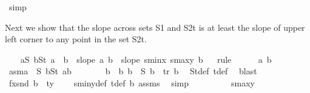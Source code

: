 \begin{isabellebody}
\ simp\isanewline
\ \ \isamarkupfalse%
%
\begin{isamarkuptext}%
Next we show that the slope across sets S1 and S2t is at least the slope of upper left corner to any point in the set S2t.%
\end{isamarkuptext}\isamarkuptrue%
\ \ \isamarkupfalse%
\ {\isachardoublequoteopen}{\isasymforall}a{\isasymin}S{}{\isachardot}{\kern0pt}\ {\isasymforall}b{\isasymin}S{}t{\isachardot}{\kern0pt}\ a\ {\isacharless}{\kern0pt}\ b\ {\isasymlongrightarrow}\ slope\ a\ b\ {\isasymge}\ slope\ {\isacharparenleft}{\kern0pt}s{}{\isacharunderscore}{\kern0pt}minx{\isacharcomma}{\kern0pt}\ s{}{\isacharunderscore}{\kern0pt}maxy{\isacharparenright}{\kern0pt}\ b{\isachardoublequoteclose}\isanewline
\ \ \isamarkupfalse%
{\isacharparenleft}{\kern0pt}rule{\isacharplus}{\kern0pt}{\isacharparenright}{\kern0pt}\isanewline
\ \ \ \ \isamarkupfalse%
\ a\ b\ \isamarkupfalse%
\ asm{\isacharcolon}{\kern0pt}{\isachardoublequoteopen}a\ {\isasymin}\ S{}{\isachardoublequoteclose}\ {\isachardoublequoteopen}b{\isasymin}S{}t{\isachardoublequoteclose}\ {\isachardoublequoteopen}a{\isacharless}{\kern0pt}b{\isachardoublequoteclose}\isanewline
\ \ \ \ \isamarkupfalse%
\ \isamarkupfalse%
\ b{}\ \ b{}{\isacharcolon}{\kern0pt}\ {\isachardoublequoteopen}b{}\ {\isasymin}\ S{}{\isachardoublequoteclose}\ {\isachardoublequoteopen}b\ {\isacharequal}{\kern0pt}\ {\isacharquery}{\kern0pt}tr\ b{}{\isachardoublequoteclose}\ \isamarkupfalse%
\ S{}t{\isacharunderscore}{\kern0pt}def\ t{\isacharunderscore}{\kern0pt}def\ \isamarkupfalse%
\ blast\isanewline
\ \isanewline
\ \ \ \ \isamarkupfalse%
\ fx{\isacharcolon}{\kern0pt}{\isachardoublequoteopen}snd\ b\ {\isasymge}\ ty\ {\isacharplus}{\kern0pt}\ {}{\isachardoublequoteclose}\ \isamarkupfalse%
\ s{}{\isacharunderscore}{\kern0pt}miny{\isacharunderscore}{\kern0pt}def\ t{\isacharunderscore}{\kern0pt}def\ b{}\ assms{\isacharparenleft}{\kern0pt}{}{\isacharparenright}{\kern0pt}\ \isamarkupfalse%
\ simp\isanewline
\ \ \ \ \isamarkupfalse%
\ \isamarkupfalse%
\ {\isachardoublequoteopen}{\isachardot}{\kern0pt}{\isachardot}{\kern0pt}{\isachardot}{\kern0pt}\ {\isasymge}\ s{}{\isacharunderscore}{\kern0pt}maxy{\isachardoublequoteclose}\ \isamarkupfalse%

\end{isabellebody}
